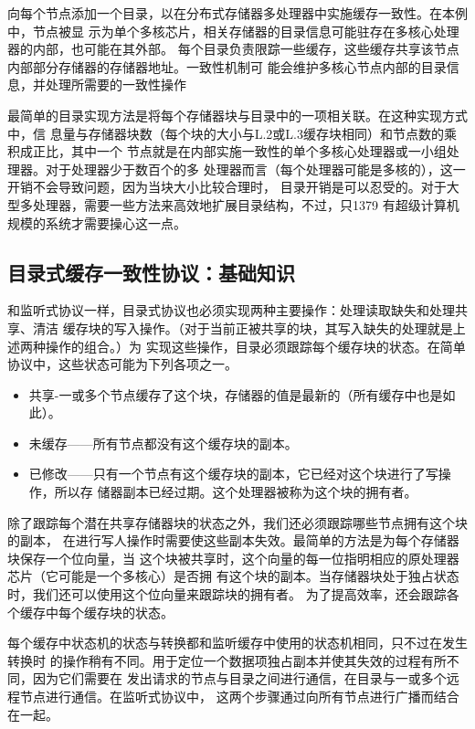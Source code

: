 向每个节点添加一个目录，以在分布式存储器多处理器中实施缓存一致性。在本例中，节点被显
示为单个多核芯片，相关存储器的目录信息可能驻存在多核心处理器的内部，也可能在其外部。
每个目录负责限踪一些缓存，这些缓存共享该节点内部部分存储器的存储器地址。一致性机制可
能会维护多核心节点内部的目录信息，并处理所需要的一致性操作

最简单的目录实现方法是将每个存储器块与目录中的一项相关联。在这种实现方式中，信
息量与存储器块数（每个块的大小与L.2或L.3缓存块相同）和节点数的乘积成正比，其中一个
节点就是在内部实施一致性的单个多核心处理器或一小组处理器。对于处理器少于数百个的多
处理器而言（每个处理器可能是多核的），这一开销不会导致问题，因为当块大小比较合理时，
目录开销是可以忍受的。对于大型多处理器，需要一些方法来高效地扩展目录结构，不过，只1379
有超级计算机规模的系统才需要操心这一点。

\subsection{目录式缓存一致性协议：基础知识}
和监听式协议一样，目录式协议也必须实现两种主要操作：处理读取缺失和处理共享、清洁
缓存块的写入操作。（对于当前正被共享的块，其写入缺失的处理就是上述两种操作的组合。）为
实现这些操作，目录必须跟踪每个缓存块的状态。在简单协议中，这些状态可能为下列各项之一。
\begin{itemize}
    \item 共享-一或多个节点缓存了这个块，存储器的值是最新的（所有缓存中也是如此）。
    \item 未缓存——所有节点都没有这个缓存块的副本。
    \item 已修改——只有一个节点有这个缓存块的副本，它已经对这个块进行了写操作，所以存
    储器副本已经过期。这个处理器被称为这个块的拥有者。
\end{itemize}

除了跟踪每个潜在共享存储器块的状态之外，我们还必须跟踪哪些节点拥有这个块的副本，
在进行写人操作时需要使这些副本失效。最简单的方法是为每个存储器块保存一个位向量，当
这个块被共享时，这个向量的每一位指明相应的原处理器芯片（它可能是一个多核心）是否拥
有这个块的副本。当存储器块处于独占状态时，我们还可以使用这个位向量来跟踪块的拥有者。
为了提高效率，还会跟踪各个缓存中每个缓存块的状态。

每个缓存中状态机的状态与转换都和监听缓存中使用的状态机相同，只不过在发生转换时
的操作稍有不同。用于定位一个数据项独占副本并使其失效的过程有所不同，因为它们需要在
发出请求的节点与目录之间进行通信，在目录与一或多个远程节点进行通信。在监听式协议中，
这两个步骤通过向所有节点进行广播而结合在一起。

